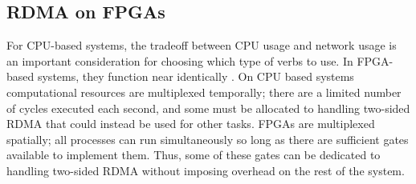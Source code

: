 \subsection{RDMA on FPGAs}

For CPU-based systems, the tradeoff between CPU usage and network usage is an important consideration for choosing which type of verbs to use. In FPGA-based systems, they function near identically \cite{strom}. On CPU based systems computational resources are multiplexed temporally; there are a limited number of cycles executed each second, and some must be allocated to handling two-sided RDMA that could instead be used for other tasks. FPGAs are multiplexed spatially; all processes can run simultaneously so long as there are sufficient gates available to implement them. Thus, some of these gates can be dedicated to handling two-sided RDMA without imposing overhead on the rest of the system.
